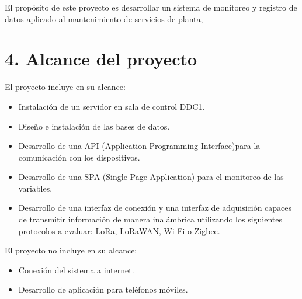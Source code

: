 \documentclass[
11pt, %
]{charter}
\begin{document}
El propósito de este proyecto es desarrollar un sistema de monitoreo y registro de datos aplicado al mantenimiento de servicios de planta, 






\section{4. Alcance del proyecto}
\label{sec:alcance}


El proyecto incluye en su alcance:
\begin{itemize} 
	\item Instalación de un servidor en sala de control DDC1.
	\item Diseño e instalación de las bases de datos.
	\item Desarrollo de una API (Application Programming Interface)para la comunicación con los dispositivos.
	\item Desarrollo de una SPA (Single Page Application) para el monitoreo de las variables.
	\item Desarrollo de una interfaz de conexión y una interfaz de adquisición capaces de transmitir información de manera inalámbrica utilizando los siguientes protocolos a evaluar: LoRa, LoRaWAN, Wi-Fi o Zigbee.
	
\end{itemize}

El proyecto no incluye en su alcance:
\begin{itemize}
	\item Conexión del sistema a internet.
	\item Desarrollo de aplicación para teléfonos móviles.
\end{itemize}
\end{document}
